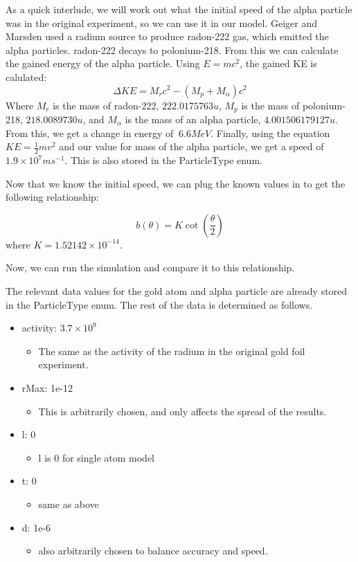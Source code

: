 \documentclass[11pt]{article}
\providecommand{\tightlist}{%
      \setlength{\itemsep}{0pt}\setlength{\parskip}{0pt}}
\begin{document}
As a quick interlude, we will work out what the initial speed of the
alpha particle was in the original experiment, so we can use it in our
model. Geiger and Marsden used a radium source to produce radon-222 gas,
which emitted the alpha particles. radon-222 decays to polonium-218.
From this we can calculate the gained energy of the alpha particle.
Using \(E=mc^{2}\), the gained KE is calulated:
\[ \Delta KE = M_{r}c^{2} - (M_{p}+M_{\alpha})c^{2} \] Where \(M_{r}\)
is the mass of radon-222, \(222.0175763u\), \(M_{p}\) is the mass of
polonium-218, \(218.0089730u\), and \(M_{\alpha}\) is the mass of an
alpha particle, \(4.001506179127u\). From this, we get a change in
energy of \(~6.6MeV\). Finally, using the equation
\(KE = \frac{1}{2}mv^{2}\) and our value for mass of the alpha particle,
we get a speed of \(1.9\times 10^{7}ms^{-1}\). This is also stored in
the ParticleType enum.

Now that we know the initial speed, we can plug the known values in to
get the following relationship:

\[ b(\theta) = K\cot(\frac{\theta}{2}) \] where
\(K = 1.52142\times 10^{-14}\).

Now, we can run the simulation and compare it to this relationship.

The relevant data values for the gold atom and alpha particle are
already stored in the ParticleType enum. The rest of the data is
determined as follows.

\begin{itemize}
\tightlist
\item
  activity: \(3.7\times 10^{9}\)

  \begin{itemize}
  \tightlist
  \item
    The same as the activity of the radium in the original gold foil
    experiment.
  \end{itemize}
\item
  rMax: 1e-12

  \begin{itemize}
  \tightlist
  \item
    This is arbitrarily chosen, and only affects the spread of the
    results.
  \end{itemize}
\item
  l: 0

  \begin{itemize}
  \tightlist
  \item
    l is 0 for single atom model
  \end{itemize}
\item
  t: 0

  \begin{itemize}
  \tightlist
  \item
    same as above
  \end{itemize}
\item
  d: 1e-6

  \begin{itemize}
  \tightlist
  \item
    also arbitrarily chosen to balance accuracy and speed.
  \end{itemize}
\end{itemize}
\end{document}
